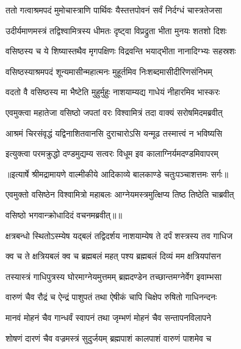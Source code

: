 \twolineshloka
{ततो गत्वाश्रमपदं मुमोचास्त्राणि पार्थिवः}
{यैस्तत्तपोवनं सर्वं निर्दग्धं चास्त्रतेजसा} %

\twolineshloka
{उदीर्यमाणमस्त्रं तद्विश्वामित्रस्य धीमतः}
{दृष्ट्वा विप्रद्रुता भीता मुनयः शतशो दिशः} %

\twolineshloka
{वसिष्ठस्य च ये शिष्यास्तथैव मृगपक्षिणः}
{विद्रवन्ति भयाद्भीता नानादिग्भ्यः सहस्रशः} %

\twolineshloka
{वसिष्ठस्याश्रमपदं शून्यमासीन्महात्मनः}
{मुहूर्तमिव निःशब्दमासीदीरिणसंनिभम्} %

\twolineshloka
{वदतो वै वसिष्ठस्य मा भैष्टेति मुहुर्मुहुः}
{नाशयाम्यद्य गाधेयं नीहारमिव भास्करः} %

\twolineshloka
{एवमुक्त्वा महातेजा वसिष्ठो जपतां वरः}
{विश्वामित्रं तदा वाक्यं सरोषमिदमब्रवीत्} %

\twolineshloka
{आश्रमं चिरसंवृद्धं यद्विनाशितवानसि}
{दुराचारोऽसि यन्मूढ तस्मात्त्वं न भविष्यसि} %

\twolineshloka
{इत्युक्त्वा परमक्रुद्धो दण्डमुद्यम्य सत्वरः}
{विधूम इव कालाग्निर्यमदण्डमिवापरम्} %


{॥इत्यार्षे श्रीमद्रामायणे वाल्मीकीये आदिकाव्ये बालकाण्डे चतुःपञ्चाशत्तमः सर्गः॥}


\twolineshloka
{एवमुक्तो वसिष्ठेन विश्वामित्रो महाबलः}
{आग्नेयमस्त्रमुत्क्षिप्य तिष्ठ तिष्ठेति चाब्रवीत्} %

{वसिष्ठो भगवान्क्रोधादिदं वचनमब्रवीत्॥॥} %

\addtocounter{shlokacount}{1}

\twolineshloka
{क्षत्रबन्धो स्थितोऽस्म्येष यद्बलं तद्विदर्शय}
{नाशयाम्येष ते दर्पं शस्त्रस्य तव गाधिज} %

\twolineshloka
{क्व च ते क्षत्रियबलं क्व च ब्रह्मबलं महत्}
{पश्य ब्रह्मबलं दिव्यं मम क्षत्रियपांसन} %

\twolineshloka
{तस्यास्त्रं गाधिपुत्रस्य घोरमाग्नेयमुत्तमम्}
{ब्रह्मदण्डेन तच्छान्तमग्नेर्वेग इवाम्भसा} %

\twolineshloka
{वारुणं चैव रौद्रं च ऐन्द्रं पाशुपतं तथा}
{ऐषीकं चापि चिक्षेप रुषितो गाधिनन्दनः} %

\twolineshloka
{मानवं मोहनं चैव गान्धर्वं स्वापनं तथा}
{जृम्भणं मोहनं चैव सन्तापनविलापने} %

\twolineshloka
{शोषणं दारणं चैव वज्रमस्त्रं सुदुर्जयम्}
{ब्रह्मपाशं कालपाशं वारुणं पाशमेव च} %

